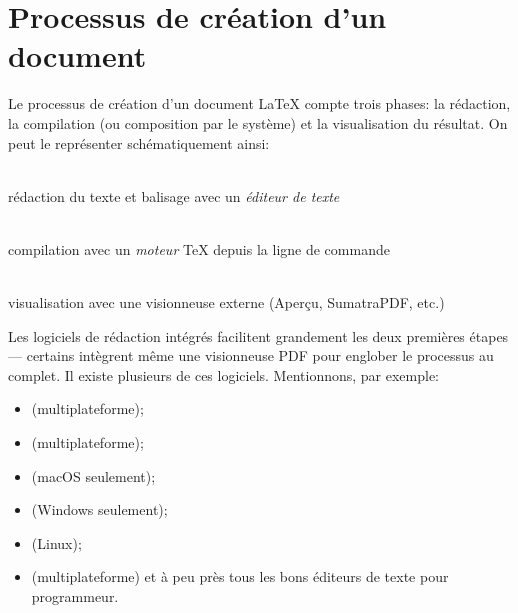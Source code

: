 \section{Processus de création d'un document}
\label{sec:presentation:processus}

Le processus de création d'un document {\LaTeX} compte trois phases:
la rédaction, la compilation (ou composition par le système) et la
visualisation du résultat. On peut le représenter schématiquement
ainsi:
\begin{center}
  \begin{minipage}[t]{0.25\linewidth}
    \centering
    {\Huge\faFileTextO} \\ \medskip
    rédaction du texte et balisage avec un \emph{éditeur de texte}
  \end{minipage}
  \quad{\Large\faArrowRight}\quad
  \begin{minipage}[t]{0.25\linewidth}
    \centering
    {\Huge\faCogs} \\ \medskip
    compilation avec un \emph{moteur} {\TeX} depuis la ligne de commande
  \end{minipage}
  \quad{\Large\faArrowRight}\quad
  \begin{minipage}[t]{0.25\linewidth}
    \centering
    {\Huge\faFilePdfO} \\ \medskip
    visualisation avec une visionneuse externe (Aperçu,
    SumatraPDF, etc.)
  \end{minipage}
\end{center}

Les logiciels de rédaction intégrés facilitent grandement les deux
premières étapes --- certains intègrent même une visionneuse PDF pour
englober le processus au complet. Il existe plusieurs de ces
logiciels. Mentionnons, par exemple:
\begin{itemize}
\item {}
  (multiplateforme);
\item {} (multiplateforme);
\item {} (macOS seulement);
\item {} (Windows seulement);
\item {} (Linux);
\item {}
  (multiplateforme) et à peu près tous les bons éditeurs de texte pour
  programmeur.
\end{itemize}


